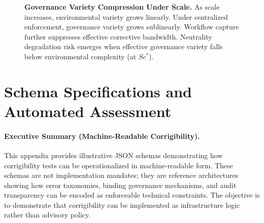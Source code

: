 \documentclass{article}
\begin{document}
\begin{figure}[htbp]
\centering
{}
\caption{\textbf{Governance Variety Compression Under Scale.} As scale increases, environmental variety grows linearly. Under centralized enforcement, governance variety grows sublinearly. Workflow capture further suppresses effective corrective bandwidth. Neutrality degradation risk emerges when effective governance variety falls below environmental complexity (at $Sc^*$).}
\label{fig:variety-compression}
\end{figure}

\section{Schema Specifications and Automated Assessment}
\label{appendix:schema}

\paragraph{Executive Summary (Machine-Readable Corrigibility).}
This appendix provides illustrative JSON schemas demonstrating how corrigibility tests can be operationalized in machine-readable form. These schemas are not implementation mandates; they are reference architectures showing how error taxonomies, binding governance mechanisms, and audit transparency can be encoded as enforceable technical constraints. The objective is to demonstrate that corrigibility can be implemented as infrastructure logic rather than advisory policy.
\end{document}
